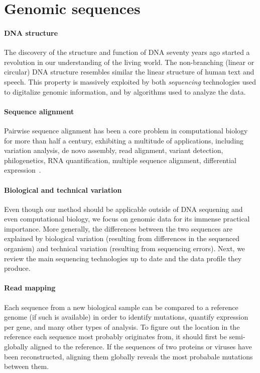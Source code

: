 \section*{Genomic sequences}

\paragraph{DNA structure}
The discovery of the structure and function of DNA\citep{watson1953structure}
seventy years ago started a revolution in our understanding of the living world.
The non-branching (linear or circular) DNA structure resembles similar the
linear structure of human text and speech. This property is massively exploited
by both \emph{sequencing} technologies used to digitalize genomic information,
and by algorithms used to analyze the data.

\paragraph{Sequence alignment}
Pairwise sequence alignment has been a core problem in computational biology for
more than half a century, exhibiting a multitude of applications, including
variation analysis, de novo assembly, read alignment, variant detection,
philogenetics, RNA quantification, multiple sequence alignment, differential
expression~\citep{prjibelski2018sequence}.

\paragraph{Biological and technical variation}
Even though our method should be applicable outside of DNA sequening and even
computational biology, we focus on genomic data for its immense practical
importance. More generally, the differences between the two sequences are
explained by biological variation (resulting from differences in the sequenced
organism) and technical variation (resulting from sequencing errors). Next, we
review the main sequencing technologies up to date and the data profile they
produce.

\paragraph{Read mapping}
Each sequence from a new biological sample can be compared to a reference genome
(if such is available) in order to identify mutations, quantify expression per
gene, and many other types of analysis. To figure out the location in the
reference each sequence most probably originates from, it should first be
semi-globally aligned to the reference. If the sequences of two proteins or
viruses have been reconstructed, aligning them globally reveals the most
probabale mutations between them.

